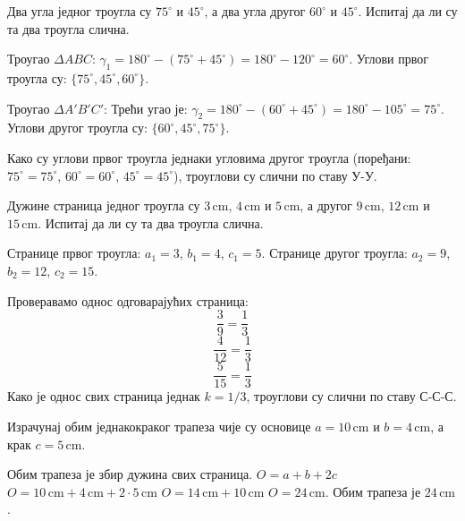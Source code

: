 \documentclass[11pt,a5paper,addpoints,noanswers]{exam}
\def\measure#1#2{#1 \, \mathrm{#2}}
\begin{document}
\begin{questions}

\question[3]
 Два угла једног троугла су
 $75^\circ$ и
 $45^\circ$, а два угла другог
 $60^\circ$ и
 $45^\circ$.
 Испитај да ли су та два троугла слична.
 \begin{solution}[\stretch 4] %
  Троугао $\Delta ABC$:
  $\gamma_1 = 180^\circ - (75^\circ + 45^\circ) = 180^\circ - 120^\circ = 60^\circ$.
  Углови првог троугла су: $\{75^\circ, 45^\circ, 60^\circ\}$.

  Троугао $\Delta A'B'C'$:
  Трећи угао је: $\gamma_2 = 180^\circ - (60^\circ + 45^\circ) = 180^\circ - 105^\circ = 75^\circ$.
  Углови другог троугла су: $\{60^\circ, 45^\circ, 75^\circ\}$.

  Како су углови првог троугла једнаки угловима другог троугла (поређани: $75^\circ=75^\circ$, $60^\circ=60^\circ$, $45^\circ=45^\circ$), троуглови су слични по ставу У-У.
 \end{solution}
 \answerline

\ifprintanswers\else\newpage\fi %

\question[3]
 Дужине страница једног троугла су
 $\measure{3}{cm}$,
 $\measure{4}{cm}$ и
 $\measure{5}{cm}$, а другог
 $\measure{9}{cm}$,
 $\measure{12}{cm}$ и
 $\measure{15}{cm}$.
 Испитај да ли су та два троугла слична.
 \begin{solution}[\stretch 4] %
  Странице првог троугла: $a_1=3$, $b_1=4$, $c_1=5$.
  Странице другог троугла: $a_2=9$, $b_2=12$, $c_2=15$.

  Проверавамо однос одговарајућих страница:
  $$ \frac{3}{9} = \frac{1}{3} $$
  $$ \frac{4}{12} = \frac{1}{3} $$
  $$ \frac{5}{15} = \frac{1}{3} $$
  Како је однос свих страница једнак $k = 1/3$, троуглови су слични по ставу С-С-С.
 \end{solution}
 \answerline

\question[3]
 Израчунај обим једнакокраког трапеза чије су основице $a=\measure{10}{cm}$ и $b=\measure{4}{cm}$, а крак $c=\measure{5}{cm}$.
 \begin{solution}[\stretch 4] %
  Обим трапеза је збир дужина свих страница.
  $O = a + b + 2c$
  $O = 10\,\mathrm{cm} + 4\,\mathrm{cm} + 2 \cdot 5\,\mathrm{cm}$
  $O = 14\,\mathrm{cm} + 10\,\mathrm{cm}$
  $O = \measure{24}{cm}$.
  Обим трапеза је $\measure{24}{cm}$.
 \end{solution}
 \answerline


\end{questions}
\end{document}
